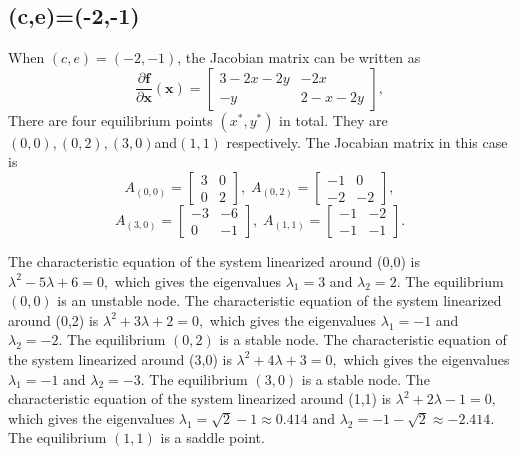 \documentclass[a4paper,twocolumn]{article} %
\begin{document}
\subsection{(c,e)=(-2,-1)}
When $(c,e)=(-2,-1)$, the Jacobian matrix can be written as
\begin{equation*}
    \frac{\partial\textbf{f}}{\partial \textbf{x}}(\textbf{x}) =
    \left[\begin{array}{cc}
    3-2x-2y & -2x \\
    -y & 2-x-2y
    \end{array}\right],
\end{equation*}
There are four equilibrium points $(x^*,y^*)$ in total. They are $(0,0),(0,2),(3,0)$and$(1,1)$ respectively. The Jocabian matrix in this case is
\begin{equation*}
    A_{(0,0)} =
    \left[\begin{array}{cc}
    3 & 0 \\
    0 & 2
    \end{array}\right], \; A_{(0,2)} =
    \left[\begin{array}{cc}
    -1 & 0 \\
    -2 & -2
    \end{array}\right],   
    \end{equation*}
    \begin{equation*}
    A_{(3,0)} =
    \left[\begin{array}{cc}
    -3 & -6 \\
    0 & -1
    \end{array}\right], \;A_{(1,1)} =
    \left[\begin{array}{cc}
    -1 & -2 \\
    -1 & -1
    \end{array}\right].
\end{equation*}

The characteristic equation of the system linearized around \mbox{(0,0)} is $\lambda^2 -5 \lambda + 6 = 0,$ which gives the eigenvalues $\lambda_{1} = 3$ and $\lambda_{2} = 2$. The equilibrium $(0,0)$ is an unstable node. 
The characteristic equation of the system linearized around \mbox{(0,2)} is $\lambda^2 +3 \lambda + 2 = 0,$ which gives the eigenvalues $\lambda_1 = -1$ and $\lambda_2 = -2$. The equilibrium $(0,2)$ is a stable node. 
The characteristic equation of the system linearized around \mbox{(3,0)} is
$\lambda^2 +4 \lambda + 3 = 0,$ which gives the eigenvalues $\lambda_1 = -1$ and $\lambda_2 = -3$. The equilibrium $(3,0)$ is a stable node.
The characteristic equation of the system linearized around \mbox{(1,1)} is $\lambda^2 +2 \lambda - 1 = 0,$ which gives the eigenvalues $\lambda_1 = \sqrt{2} -1 \approx 0.414$ and $\lambda_2 = -1 -\sqrt{2} \approx -2.414$. The equilibrium $(1,1)$ is a saddle point.
\end{document}
